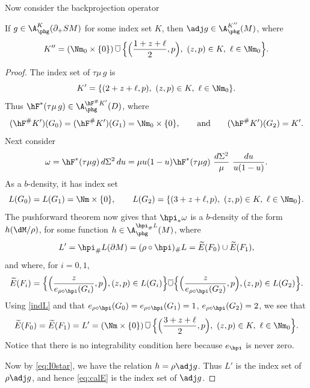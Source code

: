 Now consider the backprojection operator
\begin{Lemma}\label{lem:I0star} If $g\in \A_{\phg}^K (\partial_+ SM)$ for some index set $K$, then $\adj g \in \A_{\phg}^{K''} (M)$, where\vspace*{-3pt}
\begin{equation}
K'' = (\Nm_0\times \{0\}) \, \overline{\cup} \, \Bigl\{ \Bigl(\frac{1+z+\ell}{2}, p\Bigr),\ (z,p)\in K,\ \ell\in \Nm_0 \Bigr\}.
\label{eq:calE}
\end{equation}
\end{Lemma}

\begin{proof}
The index set of $\tau\mu \, g$ is\vspace*{-3pt}
\begin{equation*}
K' = \{ (2 + z +\ell, p),\ (z,p)\in K,\ \ell\in \Nm_0 \}.
\end{equation*}
Thus $\hF^* (\tau\mu \, g) \in \A_{\phg}^{\hF^\# K'}(D)$, where\vspace*{-3pt}
\begin{equation*}
(\hF^\# K')(G_0) = (\hF^\# K')(G_1) = \Nm_0 \times \{0\}, \qquad\text{and}\qquad (\hF^\# K')(G_2) = K'.
\end{equation*}
Next consider\vspace*{-3pt}
\begin{equation*}
\omega = \hF^* (\tau\mu g)\,d\Sigma^2\,du = \mu u(1-u) \hF^* (\tau\mu g)\ \frac{d\Sigma^2}{\mu}\ \frac{du}{u(1-u)}.
\end{equation*}
As a $b$-density, it has index set
\begin{equation}
L(G_0) = L(G_1) = \Nm \times \{0\}, \qquad L(G_2) = \{ (3 + z+\ell,p),\ (z,p)\in K,\ \ell\in \Nm_0 \}.
\label{indL}
\end{equation}
The pushforward theorem now gives that $\hpi_* \omega$ is a $b$-density of the form $h (\dM/\rho)$, for some function $h\in \A_{\phg}^{\hpi_\# L} (M)$, where
\begin{equation*}
L' = \hpi_\# L (\partial M) = (\rho\circ \hpi)_\# L = \widetilde{E}(F_0) \cup \widetilde {E} (F_1),
\end{equation*}
and where, for $i=0,1$,
\begin{equation*}
\widetilde{E}(F_i) = \Bigl\{ \Bigl(\frac{z}{e_{\rho\circ\hpi}(G_i)}, p \Bigr), (z,p)\in L(G_i) \Bigr\} \overline{\cup} \Bigl\{ \Bigl(\frac{z}{e_{\rho\circ\hpi}(G_2)}, p \Bigr), (z,p)\in L(G_2) \Bigr\}.
\end{equation*}
Using \eqref{indL} and that $e_{\rho\circ\hpi}(G_0) = e_{\rho\circ\hpi}(G_1) = 1$, $e_{\rho \circ \hpi}(G_2) = 2$, we see that
\begin{equation*}
\widetilde{E}(F_0) = \widetilde{E}(F_1) = L' = (\Nm\times \{0\}) \, \overline{\cup} \, \Bigl\{ \Bigl(\frac{3+z +\ell}{2}, p \Bigr),\ (z,p)\in K,\ \ell\in\Nm_0 \Bigr\}.
\end{equation*}
Notice that there is no integrability condition here because $e_{\hpi}$ is never zero.

Now by \eqref{eq:I0star}, we have the relation $h = \rho \adj g$. Thus $L'$ is the index set of $\rho \adj g$, and hence \eqref{eq:calE} is the index set of $\adj g$.
\end{proof}

